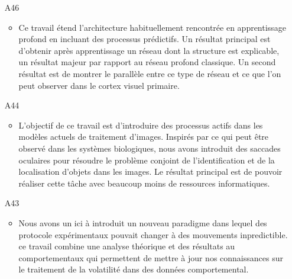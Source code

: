 \begin{enumerate}
\item[A46] %
\begin{itemize}
  \item Ce travail étend l'architecture habituellement rencontrée en apprentissage profond en incluant des processus prédictifs. Un résultat principal est d'obtenir après apprentissage un réseau dont la structure est explicable, un résultat majeur par rapport au réseau profond classique. Un second résultat est de montrer le parallèle entre ce type de réseau et ce que l'on peut observer dans le cortex visuel primaire.
\end{itemize}
%

\item[A44]  %
\begin{itemize}
  \item L'objectif de ce travail est d'introduire des processus actifs dans les modèles actuels de traitement d'images. Inspirés par ce qui peut être observé dans les systèmes biologiques, nous avons introduit des saccades oculaires pour résoudre le problème conjoint de l'identification et de la localisation d'objets dans les images. Le résultat principal est de pouvoir réaliser cette tâche avec beaucoup moins de ressources informatiques.
\end{itemize}

\item[A43] %
\begin{itemize}
  \item Nous avons un ici à introduit un nouveau paradigme dans lequel des protocole expérimentaux pouvait changer à des mouvements inpredictible. ce travail combine une analyse théorique et des résultats au comportementaux qui permettent de mettre à jour nos connaissances sur le traitement de la volatilité dans des données comportemental.
\end{itemize}

%
%
%
%


\end{enumerate}
